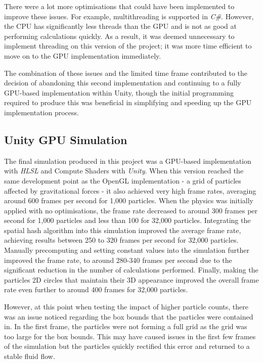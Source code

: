 \documentclass[12pt]{article}
\begin{document}
    There were a lot more optimisations that could have been implemented to improve these issues. For example, multithreading is supported in \textit{C\#}. However, the CPU has significantly less threads than the GPU and is not as good at performing calculations quickly. As a result, it was deemed unnecessary to implement threading on this version of the project; it was more time efficient to move on to the GPU implementation immediately.

    The combination of these issues and the limited time frame contributed to the decision of abandoning this second implementation and continuing to a fully GPU-based implementation within Unity, though the initial programming required to produce this was beneficial in simplifying and speeding up the GPU implementation process.


    \subsection{Unity GPU Simulation}
    
    The final simulation produced in this project was a GPU-based implementation with \textit{HLSL} and Compute Shaders with \textit{Unity}. When this version reached the same development point as the OpenGL implementation - a grid of particles affected by gravitational forces - it also achieved very high frame rates, averaging around 600 frames per second for 1,000 particles. When the physics was initially applied with no optimisations, the frame rate decreased to around 300 frames per second for 1,000 particles and less than 100 for 32,000 particles. Integrating the spatial hash algorithm into this simulation improved the average frame rate, achieving results between 250 to 320 frames per second for 32,000 particles. Manually precomputing and setting constant values into the simulation further improved the frame rate, to around 280-340 frames per second due to the significant reduction in the number of calculations performed. Finally, making the particles 2D circles that maintain their 3D appearance improved the overall frame rate even further to around 400 frames for 32,000 particles.
    
    However, at this point when testing the impact of higher particle counts, there was an issue noticed regarding the box bounds that the particles were contained in. In the first frame, the particles were not forming a full grid as the grid was too large for the box bounds. This may have caused issues in the first few frames of the simulation but the particles quickly rectified this error and returned to a stable fluid flow.
\end{document}
